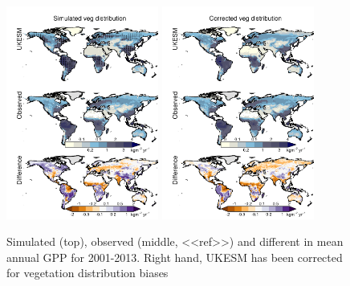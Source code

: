 \documentclass[bg, manuscript]{copernicus}
\begin{document}
\begin{figure}[t]
        \includegraphics[width=5cm]{figs/GPP/fire_var_seasonality-maps-AA-mapscontrol-gpp.png}
        \includegraphics[width=5cm]{figs/GPP/fire_var_seasonality-maps-AA-mapsobsVegDist-gpp.png}
    
    \caption{Simulated (top), observed (middle, <<ref>>) and different in mean annual GPP for 2001-2013. Right hand, UKESM has been corrected for vegetation distribution biases \label{fig:GPPmap}}
\end{figure}
\end{document}
